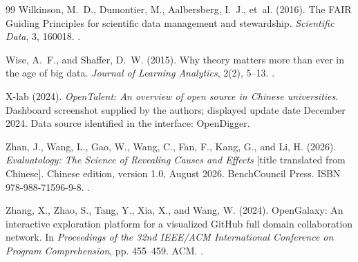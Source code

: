 \begin{thebibliography}{99}
Wilkinson, M.~D., Dumontier, M., Aalbersberg, I.~J., et~al. (2016).
The FAIR Guiding Principles for scientific data management and stewardship.
\emph{Scientific Data}, 3, 160018.
.

Wise, A.~F., and Shaffer, D.~W. (2015).
Why theory matters more than ever in the age of big data.
\emph{Journal of Learning Analytics}, 2(2), 5--13.
.

X-lab (2024).
\emph{OpenTalent: An overview of open source in Chinese universities}.
Dashboard screenshot supplied by the authors; displayed update date December 2024. Data source identified in the interface: OpenDigger.

Zhan, J., Wang, L., Gao, W., Wang, C., Fan, F., Kang, G., and Li, H. (2026).
\emph{Evaluatology: The Science of Revealing Causes and Effects} [title translated from Chinese].
Chinese edition, version 1.0, August 2026. BenchCouncil Press.
ISBN 978-988-71596-9-8. .

Zhang, X., Zhao, S., Tang, Y., Xia, X., and Wang, W. (2024).
OpenGalaxy: An interactive exploration platform for a visualized GitHub full domain collaboration network.
In \emph{Proceedings of the 32nd IEEE/ACM International Conference on Program Comprehension}, pp. 455--459. ACM.
.

\end{thebibliography}
\endgroup
